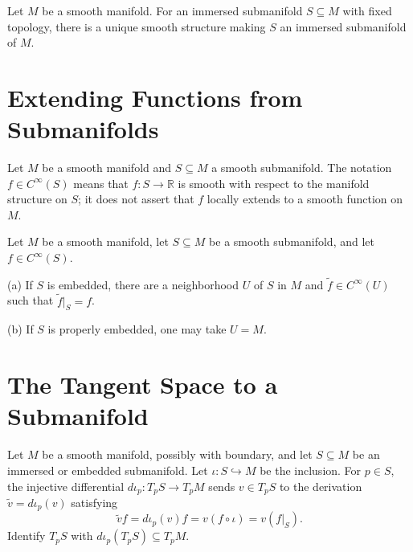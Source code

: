 \begin{theorem}
\label{thm:5-32}
\leanok
{}
Let $M$ be a smooth manifold. For an immersed submanifold $S\subseteq M$ with
fixed topology, there is a unique smooth structure making $S$ an immersed
submanifold of $M$.
\end{theorem}


\section{Extending Functions from Submanifolds}

\begin{notation}
\label{not:5-34-extra-1}
\mathlibok
Let $M$ be a smooth manifold and $S\subseteq M$ a smooth submanifold. The
notation $f\in C^\infty(S)$ means that $f:S\to\mathbb R$ is smooth with
respect to the manifold structure on $S$; it does not assert that $f$ locally
extends to a smooth function on $M$.
\end{notation}

\begin{lemma}
\label{lem:5-34}
\leanok
{}
Let $M$ be a smooth manifold, let $S\subseteq M$ be a smooth submanifold, and
let $f\in C^\infty(S)$.

(a) If $S$ is embedded, there are a neighborhood $U$ of $S$ in $M$ and
$\widetilde f\in C^\infty(U)$ such that $\widetilde f|_S=f$.

(b) If $S$ is properly embedded, one may take $U=M$.
\end{lemma}


\section{The Tangent Space to a Submanifold}

\begin{notation}
\label{not:5-35-extra-1}
\leanok
Let $M$ be a smooth manifold, possibly with boundary, and let $S\subseteq M$ be
an immersed or embedded submanifold. Let $\iota:S\hookrightarrow M$ be the
inclusion. For $p\in S$,
the injective differential $d\iota_p:T_pS\to T_pM$ sends $v\in T_pS$ to the
derivation $\widetilde v=d\iota_p(v)$ satisfying
\[
\widetilde v f=d\iota_p(v)f=v(f\circ\iota)=v(f|_S).
\]
Identify $T_pS$ with $d\iota_p(T_pS)\subseteq T_pM$.
\end{notation}

